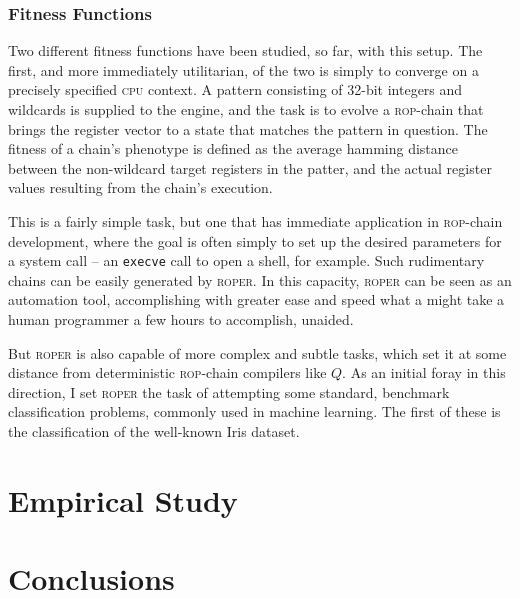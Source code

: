 \subsubsection{Fitness Functions}

Two different fitness functions have been studied, so far, with
this setup. The first, and more immediately utilitarian, of the
two is simply to converge on a precisely specified \textsc{cpu}
context. A pattern consisting of 32-bit integers and wildcards is
supplied to the engine, and the task is to evolve a
\textsc{rop}-chain that brings the register vector to a state
that matches the pattern in question. The fitness of a chain's
phenotype is defined as the average hamming distance between the
non-wildcard target registers in the patter, and the actual
register values resulting from the chain's execution. 

This is a fairly simple task, but one that has immediate
application in \textsc{rop}-chain development, where the goal is
often simply to set up the desired parameters for a system call
-- an \texttt{execve} call to open a shell, for example. Such
rudimentary chains can be easily generated by \textsc{roper}. 
In this capacity, \textsc{roper} can be seen as an automation
tool, accomplishing with greater ease and speed what a might take
a human programmer a few hours to accomplish, unaided. 

But \textsc{roper} is also capable of more complex and subtle
tasks, which set it at some distance from deterministic
\textsc{rop}-chain compilers like $Q$. As an initial foray in
this direction, I set \textsc{roper} the task of attempting some
standard, benchmark classification problems, commonly used in
machine learning. The first of these is the classification of the
well-known Iris dataset. 


\section{Empirical Study}


\section{Conclusions}



